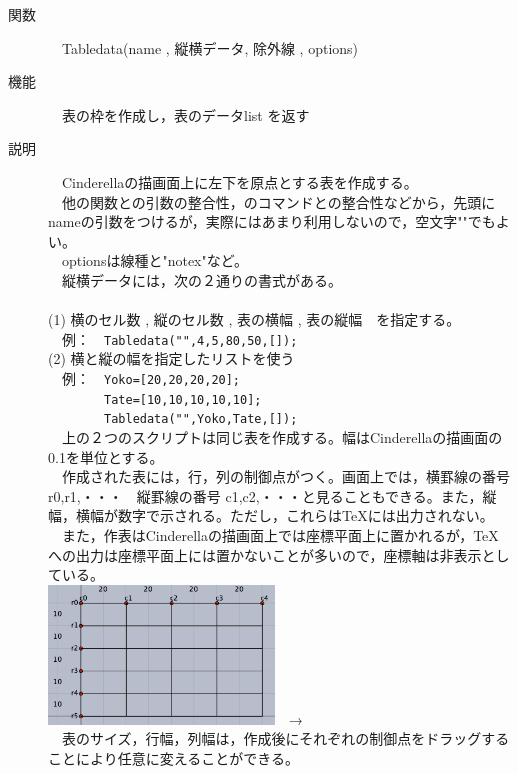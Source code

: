 \documentclass[papersize,a4paper,12pt,uplatex]{jsarticle}
\begin{document}
\begin{description}

\hypertarget{tabledata}{}
\item[関数]　Tabledata(name , 縦横データ, 除外線 , options)
\item[機能]　表の枠を作成し，表のデータlist を返す
\item[説明]　Cinderellaの描画面上に左下を原点とする表を作成する。\\
　他の関数との引数の整合性，\ketpic のコマンドとの整合性などから，先頭にnameの引数をつけるが，実際にはあまり利用しないので，空文字""でもよい。\\
　optionsは線種と"notex"など。\\
　縦横データには，次の２通りの書式がある。\\
　\\
(1) 横のセル数 , 縦のセル数 , 表の横幅 , 表の縦幅　を指定する。\\
　例：　\verb|Tabledata("",4,5,80,50,[]);|\\
(2) 横と縦の幅を指定したリストを使う\\
　例：　\verb|Yoko=[20,20,20,20];|\\
　　　　\verb|Tate=[10,10,10,10,10];|\\
　　　　\verb|Tabledata("",Yoko,Tate,[]);|\\
　上の２つのスクリプトは同じ表を作成する。幅はCinderellaの描画面の0.1を単位とする。\\
　作成された表には，行，列の制御点がつく。画面上では，横罫線の番号 r0,r1,・・・　縦罫線の番号 c1,c2,・・・と見ることもできる。また，縦幅，横幅が数字で示される。ただし，これらは\TeX には出力されない。\\
　また，作表はCinderellaの描画面上では座標平面上に置かれるが，\TeX への出力は座標平面上には置かないことが多いので，座標軸は非表示としている。\\

\includegraphics[bb=0 0 807 499 , width=6cm]{Fig/table01.png}　→　
\\

　表のサイズ，行幅，列幅は，作成後にそれぞれの制御点をドラッグすることにより任意に変えることができる。\\


\end{description}
\end{document}
